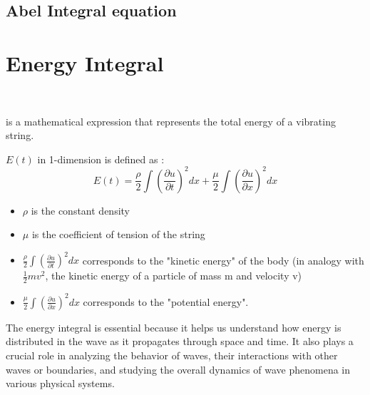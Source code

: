 \documentclass[]{article}
\begin{document}

\newpage


\subsection{Abel Integral equation}




\newpage

\section{Energy Integral}
\
\begin{definition} 
    is a mathematical expression that represents the total energy of a vibrating string.
\end{definition}
$E(t)$ in 1-dimension is defined as :
\[
E(t)  =  \frac{\rho}{2} \int {\left(\frac{\partial u}{\partial t}\right)}^2 dx + \frac{\mu}{2} \int {\left(\frac{\partial u}{\partial x}\right)}^2 dx
\] 
\begin{itemize}
    \item $\rho$ is the constant density
    \item $\mu$ is the coefficient of tension of the string
    \item $\displaystyle \frac{\rho}{2} \int {\left(\frac{\partial u}{\partial t}\right)}^2 dx $ corresponds to the "kinetic energy" of the body (in analogy with $\frac{1}{2}mv^2$, the kinetic energy of a particle of mass m and velocity v)
    \item $\displaystyle \frac{\mu}{2} \int {\left(\frac{\partial u}{\partial x}\right)}^2 dx $ corresponds to the "potential energy".
\end{itemize}

The energy integral is essential because it helps us understand how energy is distributed in the wave as it propagates through space and time. It also plays a crucial role in analyzing the behavior of waves, their interactions with other waves or boundaries, and studying the overall dynamics of wave phenomena in various physical systems.
\end{document}
